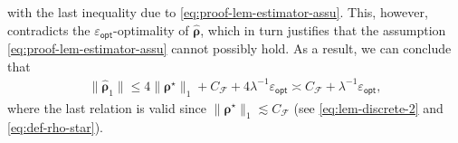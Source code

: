 \documentclass[english]{article}
\begin{document}
%
with the last inequality due to \eqref{eq:proof-lem-estimator-assu}. This, however, contradicts the $\varepsilon_{\mathsf{opt}}$-optimality of $\widehat{\bm \rho}$, which in turn justifies that the assumption \eqref{eq:proof-lem-estimator-assu} cannot possibly hold. As a result, we can conclude that
%
\begin{align}
\|\widehat{\bm \rho}_1\|\le 4\|{\bm \rho}^{\star}\|_1 +  C_{\mathcal{F}} + 4\lambda^{-1}\varepsilon_{\mathsf{opt}}\asymp C_{\mathcal{F}} + \lambda^{-1}\varepsilon_{\mathsf{opt}},
\label{eq:rho-hat-UB-123}
\end{align}
%
where the last relation is valid since $\|{\bm \rho}^{\star}\|_1\lesssim C_{\mathcal{F}}$ (see \eqref{eq:lem-discrete-2} and \eqref{eq:def-rho-star}).

\end{document}
